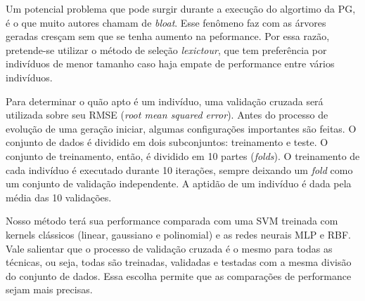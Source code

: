 Um potencial problema que pode surgir durante a execução do algortimo da PG, é o que muito autores chamam de \textit{bloat}. Esse fenômeno faz com as árvores geradas cresçam sem que se tenha aumento na peformance. Por essa razão, pretende-se utilizar o método de seleção \textit{lexictour}, que tem preferência por indivíduos de menor tamanho caso haja empate de performance entre vários indivíduos.

Para determinar o quão apto é um indivíduo, uma validação cruzada será utilizada sobre seu RMSE (\textit{root mean squared error}). Antes do processo de evolução de uma geração iniciar, algumas configurações importantes são feitas. O conjunto de dados é dividido em dois subconjuntos: treinamento e teste. O conjunto de treinamento, então, é dividido em 10 partes (\textit{folds}). O treinamento de cada indivíduo é executado durante 10 iterações, sempre deixando um \textit{fold} como um conjunto de validação independente. A aptidão de um indivíduo é dada pela média das 10 validações.

Nosso método terá sua performance comparada com uma SVM treinada com kernels clássicos (linear, gaussiano e polinomial) e as redes neurais MLP e RBF. Vale salientar que o processo de validação cruzada é o mesmo para todas as técnicas, ou seja, todas são treinadas, validadas e testadas com a mesma divisão do conjunto de dados. Essa escolha permite que as comparações de performance sejam mais precisas.